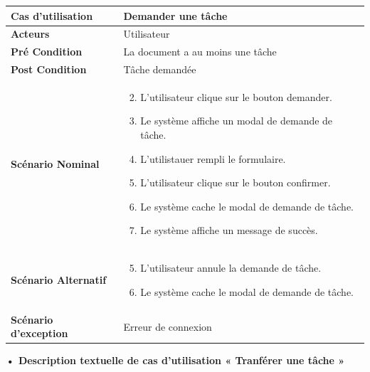 \begin{longtable}{|p{5cm}|p{10cm}|}
\hline
\textbf{Cas d'utilisation}&Demander une tâche\\
\hline
\textbf{Acteurs}&Utilisateur\\
\hline
\textbf{Pré Condition}&La document a au moins une tâche\\
\hline
\textbf{Post Condition}&Tâche demandée\\
\hline
\textbf{Scénario Nominal}&
\vspace{-\baselineskip}
\begin{enumerate}
    \setcounter{enumi}{1}
    \item L'utilisateur clique sur le bouton demander.
    \item Le système affiche un modal de demande de tâche.
    \item L'utilistauer rempli le formulaire.
    \item L'utilisateur clique sur le bouton confirmer.
    \item Le système cache le modal de demande de tâche.
    \item Le système affiche un message de succès.
\end{enumerate}\\
\hline
\textbf{Scénario Alternatif}&
\vspace{-\baselineskip}
\begin{enumerate}
    \setcounter{enumi}{4}
    \item L'utilisateur annule la demande de tâche.
    \item Le système cache le modal de demande de tâche.
\end{enumerate}\\
\hline
\textbf{Scénario d'exception}&Erreur de connexion\\
\hline
\end{longtable}


\textbf{•	Description textuelle de cas d'utilisation « Tranférer une tâche »}

